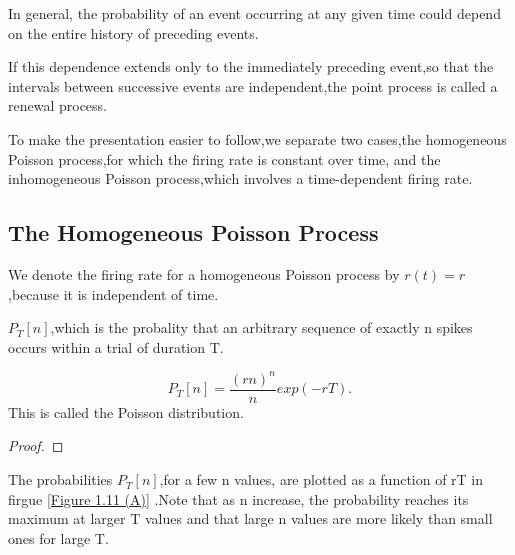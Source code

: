 \begin{defn}
    In general, the probability of an event occurring at any given time could depend on the entire history of preceding events. 
\end{defn}

\begin{defn}
    If this dependence extends only to the immediately preceding event,so that the intervals between successive events are independent,the point process is called a renewal process.
\end{defn}


\begin{defn}
    To make the presentation easier to follow,we separate two cases,the homogeneous Poisson process,for which the firing rate is constant over time, and the inhomogeneous Poisson process,which involves a time-dependent firing rate.
\end{defn}

\subsection{The Homogeneous Poisson Process}

\begin{defn}
    We denote the firing rate for a homogeneous Poisson process by $r(t)=r$,because it is independent of time.
\end{defn}

\begin{defn}
    $P_T[n]$,which is the probality that an arbitrary sequence of exactly n spikes occurs within a trial of duration T.    
\end{defn}

\begin{thm}
    \begin{equation}
        P_T[n]=\frac{(rn)^n}{n}exp(-rT).
    \end{equation}
    This is called the Poisson distribution.
    \begin{proof}
    \end{proof}
\end{thm}

\begin{exm}
    The probabilities $P_T[n]$,for a few n values, are plotted as a function of rT in  firgue \ref{Figure 1.11 (A)} .Note that as n increase, the probability reaches its maximum at larger T values and that large n values are more likely than small ones for large T.
\end{exm}    
\begin{center}
    \label{Figure 1.11 (A)}    
\end{center}


